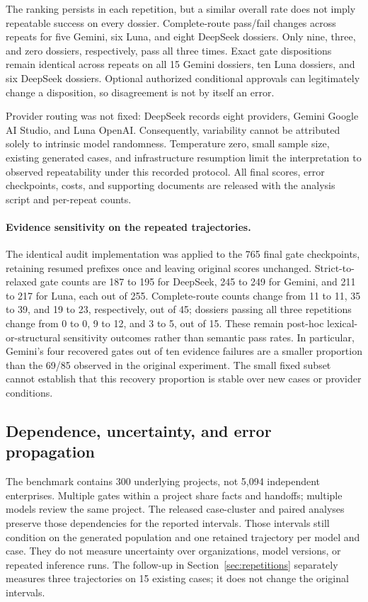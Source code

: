 The ranking persists in each repetition, but a similar overall rate does not imply repeatable
success on every dossier. Complete-route pass/fail changes across repeats for five Gemini,
six Luna, and eight DeepSeek dossiers. Only nine, three, and zero dossiers, respectively,
pass all three times. Exact gate dispositions remain identical across repeats on all 15 Gemini
dossiers, ten Luna dossiers, and six DeepSeek dossiers. Optional authorized conditional approvals
can legitimately change a disposition, so disagreement is not by itself an error.

Provider routing was not fixed: DeepSeek records eight providers, Gemini Google AI Studio,
and Luna OpenAI. Consequently, variability cannot be attributed solely to intrinsic model
randomness. Temperature zero, small sample size, existing generated cases, and infrastructure
resumption limit the interpretation to observed repeatability under this recorded protocol.
All final scores, error checkpoints, costs, and supporting documents are released with the
analysis script and per-repeat counts.

\paragraph{Evidence sensitivity on the repeated trajectories.}
The identical audit implementation was applied to the 765 final gate checkpoints, retaining
resumed prefixes once and leaving original scores unchanged. Strict-to-relaxed gate counts are
187 to 195 for DeepSeek, 245 to 249 for Gemini, and 211 to 217 for Luna, each out of 255.
Complete-route counts change from 11 to 11, 35 to 39, and 19 to 23, respectively, out of 45;
dossiers passing all three repetitions change from 0 to 0, 9 to 12, and 3 to 5, out of 15.
These remain post-hoc lexical-or-structural sensitivity outcomes rather than semantic pass rates.
In particular, Gemini's four recovered gates out of ten evidence failures are a smaller
proportion than the 69/85 observed in the original experiment. The small fixed subset cannot
establish that this recovery proportion is stable over new cases or provider conditions.

\subsection{Dependence, uncertainty, and error propagation}

The benchmark contains 300 underlying projects, not 5,094 independent enterprises. Multiple
gates within a project share facts and handoffs; multiple models review the same project.
The released case-cluster and paired analyses preserve those dependencies for the reported
intervals. Those intervals still condition on the generated population and one retained trajectory
per model and case. They do not measure uncertainty over organizations, model versions, or
repeated inference runs. The follow-up in Section~\ref{sec:repetitions} separately measures
three trajectories on 15 existing cases; it does not change the original intervals.

